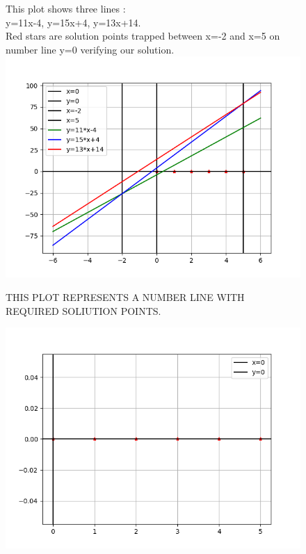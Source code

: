 \documentclass[12pt]{article}
\begin{document}
\begin{figure}

This plot shows three lines :\\
y=11x-4,
y=15x+4,
y=13x+14.
\\Red stars are solution points trapped between x=-2 and x=5 on number line y=0 verifying our solution.
\includegraphics[scale=0.9]{figure_2.png}
\end{figure}

\begin{figure}
THIS PLOT REPRESENTS A NUMBER LINE WITH REQUIRED SOLIUTION POINTS.

\includegraphics[scale=0.9]{figure_3}
\end{figure}
\end{document}
